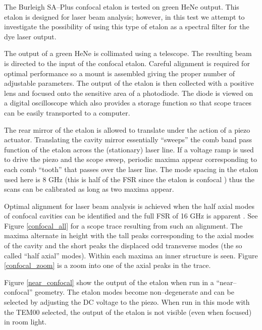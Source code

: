 
The Burleigh SA--Plus confocal etalon is tested on green HeNe output. This etalon is designed for laser beam analysis; however, in this test we attempt to investigate the possibility of using this type of etalon as a spectral filter for the dye laser output.

The output of a green HeNe is collimated using a telescope. The resulting beam is directed to the input of the confocal etalon. Careful alignment is required for optimal performance so a mount is assembled giving the proper number of adjustable parameters. The output of the etalon is then collected with a positive lens and focused onto the sensitive area of a photodiode. The diode is viewed on a digital oscilloscope which also provides a storage function so that scope traces can be easily transported to a computer.

The rear mirror of the etalon is allowed to translate under the action of a piezo actuator. Translating the cavity mirror essentially ``sweeps'' the comb band pass function of the etalon across the (stationary) laser line. If a voltage ramp is used to drive the piezo and the scope sweep, periodic maxima appear corresponding to each comb ``tooth'' that passes over the laser line. The mode spacing in the etalon used here is 8 GHz (this is half of the FSR since the etalon is confocal \cite{Siegman:1986a}) thus the scans can be calibrated as long as two maxima appear.


Optimal alignment for laser beam analysis is achieved when the half axial modes of confocal cavities can be identified and the full FSR of 16 GHz is apparent \cite{Siegman:1986a}. See Figure \ref{confocal_all} for a scope trace resulting from such an alignment. The maxima alternate in height with the tall peaks corresponding to the axial modes of the cavity and the short peaks the displaced odd transverse modes (the so called ``half axial'' modes). Within each maxima an inner structure is seen. Figure \ref{confocal_zoom} is a zoom into one of the axial peaks in the trace.


Figure \ref{near_confocal} show the output of the etalon when run in a ``near--confocal'' geometry. The etalon modes become non--degenerate and can be selected by adjusting the DC voltage to the piezo. When run in this mode with the TEM00 selected, the output of the etalon is not visible (even when focused) in room light.
